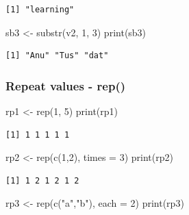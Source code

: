 \documentclass[
  letterpaper,
  DIV=11,
  numbers=noendperiod]{scrartcl}
\newenvironment{Shaded}{\begin{snugshade}}{\end{snugshade}}
\newcommand{\AttributeTok}[1]{\textcolor[rgb]{0.40,0.45,0.13}{#1}}
\newcommand{\DecValTok}[1]{\textcolor[rgb]{0.68,0.00,0.00}{#1}}
\newcommand{\FunctionTok}[1]{\textcolor[rgb]{0.28,0.35,0.67}{#1}}
\newcommand{\NormalTok}[1]{\textcolor[rgb]{0.00,0.23,0.31}{#1}}
\newcommand{\OtherTok}[1]{\textcolor[rgb]{0.00,0.23,0.31}{#1}}
\newcommand{\StringTok}[1]{\textcolor[rgb]{0.13,0.47,0.30}{#1}}
\begin{document}
\begin{verbatim}
[1] "learning"
\end{verbatim}

\begin{Shaded}
\begin{Highlighting}[]
\NormalTok{sb3 }\OtherTok{\textless{}{-}} \FunctionTok{substr}\NormalTok{(v2, }\DecValTok{1}\NormalTok{, }\DecValTok{3}\NormalTok{)}
\FunctionTok{print}\NormalTok{(sb3)}
\end{Highlighting}
\end{Shaded}

\begin{verbatim}
[1] "Anu" "Tus" "dat"
\end{verbatim}

\subsubsection{Repeat values - rep()}\label{repeat-values---rep}

\begin{Shaded}
\begin{Highlighting}[]
\NormalTok{rp1 }\OtherTok{\textless{}{-}} \FunctionTok{rep}\NormalTok{(}\DecValTok{1}\NormalTok{, }\DecValTok{5}\NormalTok{)}
\FunctionTok{print}\NormalTok{(rp1)}
\end{Highlighting}
\end{Shaded}

\begin{verbatim}
[1] 1 1 1 1 1
\end{verbatim}

\begin{Shaded}
\begin{Highlighting}[]
\NormalTok{rp2 }\OtherTok{\textless{}{-}} \FunctionTok{rep}\NormalTok{(}\FunctionTok{c}\NormalTok{(}\DecValTok{1}\NormalTok{,}\DecValTok{2}\NormalTok{), }\AttributeTok{times =} \DecValTok{3}\NormalTok{)}
\FunctionTok{print}\NormalTok{(rp2)}
\end{Highlighting}
\end{Shaded}

\begin{verbatim}
[1] 1 2 1 2 1 2
\end{verbatim}

\begin{Shaded}
\begin{Highlighting}[]
\NormalTok{rp3 }\OtherTok{\textless{}{-}} \FunctionTok{rep}\NormalTok{(}\FunctionTok{c}\NormalTok{(}\StringTok{"a"}\NormalTok{,}\StringTok{"b"}\NormalTok{), }\AttributeTok{each =} \DecValTok{2}\NormalTok{)}
\FunctionTok{print}\NormalTok{(rp3)}
\end{Highlighting}
\end{Shaded}
\end{document}
